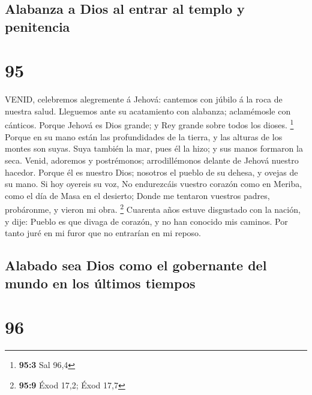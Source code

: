 \hypertarget{alabanza-a-dios-al-entrar-al-templo-y-penitencia}{%
\subsection{Alabanza a Dios al entrar al templo y
penitencia}\label{alabanza-a-dios-al-entrar-al-templo-y-penitencia}}

\hypertarget{section-94}{%
\section{95}\label{section-94}}

 VENID, celebremos alegremente á Jehová: cantemos con júbilo
á la roca de nuestra salud.  Lleguemos ante su acatamiento
con alabanza; aclamémosle con cánticos.  Porque Jehová es
Dios grande; y Rey grande sobre todos los dioses. \footnote{\textbf{95:3}
  Sal 96,4}  Porque en su mano están las profundidades de la
tierra, y las alturas de los montes son suyas.  Suya también
la mar, pues él la hizo; y sus manos formaron la seca. 
Venid, adoremos y postrémonos; arrodillémonos delante de Jehová nuestro
hacedor.  Porque él es nuestro Dios; nosotros el pueblo de
su dehesa, y ovejas de su mano. Si hoy oyereis su voz,  No
endurezcáis vuestro corazón como en Meriba, como el día de Masa en el
desierto;  Donde me tentaron vuestros padres, probáronme, y
vieron mi obra. \footnote{\textbf{95:9} Éxod 17,2; Éxod 17,7}
 Cuarenta años estuve disgustado con la nación, y dije:
Pueblo es que divaga de corazón, y no han conocido mis caminos.
 Por tanto juré en mi furor que no entrarían en mi reposo.

\hypertarget{alabado-sea-dios-como-el-gobernante-del-mundo-en-los-uxfaltimos-tiempos}{%
\subsection{Alabado sea Dios como el gobernante del mundo en los últimos
tiempos}\label{alabado-sea-dios-como-el-gobernante-del-mundo-en-los-uxfaltimos-tiempos}}

\hypertarget{section-95}{%
\section{96}\label{section-95}}

